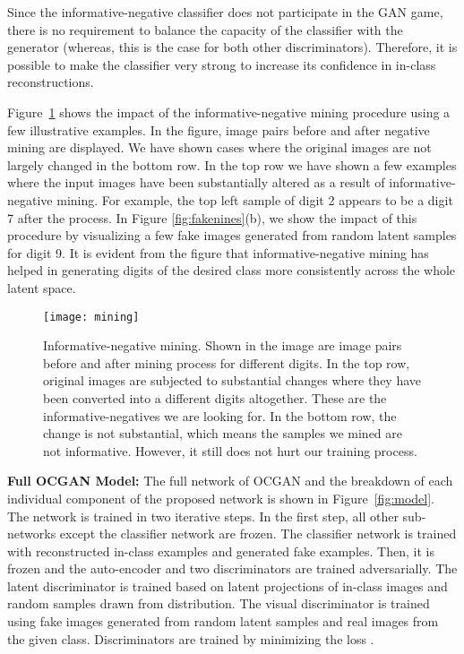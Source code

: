\documentclass[10pt,twocolumn,letterpaper]{article}
\begin{document}
Since the informative-negative classifier does not participate in the GAN game, there is no requirement to balance the capacity of the classifier with the generator (whereas, this is the case for both other discriminators). Therefore, it is possible to make the classifier very strong to increase its confidence in in-class reconstructions. 

Figure~\ref{fig:mining} shows the impact of the informative-negative mining procedure using a few illustrative examples. In the figure, image pairs before and after negative mining are displayed. We have shown cases where the original images are not largely changed in the bottom row. In the top row we have shown a few examples where the input images have been substantially altered as a result of informative-negative mining. For example, the top left sample of digit 2 appears to be a digit 7 after the process. In Figure \ref{fig:fakenines}(b), we show the impact of this procedure by visualizing a few fake images generated from random latent samples for digit 9. It is evident from the figure that informative-negative mining has helped in generating digits of the desired class more consistently across the whole latent space. 


\begin{figure}
    \centering
\texttt{[image: mining]}\hskip30pt
    \caption{Informative-negative mining. Shown in the image are image pairs before and after mining process for different digits. In the top row, original images are subjected to substantial changes where they have been converted into a different digits altogether. These are the informative-negatives we are looking for. In the bottom row, the change is not substantial, which means the samples we mined are not informative. However, it still does not hurt our training process.}
    \label{fig:mining}
\end{figure}

\noindent \textbf{Full OCGAN Model:} The full network of OCGAN and the breakdown of each individual component of the proposed network is shown in Figure~\ref{fig:model}. The network is trained in two iterative steps. In the first step, all other sub-networks except the classifier network are frozen. The classifier network is trained with reconstructed in-class examples and generated fake examples. Then, it is frozen and the auto-encoder and two discriminators are trained adversarially. The latent discriminator is trained based on latent projections of in-class images and random samples drawn from  distribution. The visual discriminator is trained using fake images generated from random latent samples and real images from the given class. Discriminators are trained by minimizing the loss .
\end{document}
